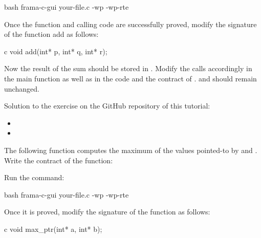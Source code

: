 \begin{CodeBlock}{bash}
frama-c-gui your-file.c -wp -wp-rte
\end{CodeBlock}



Once the function and calling code are successfully proved, modify the
signature of the function add as follows:



\begin{CodeBlock}{c}
void add(int* p, int* q, int* r);
\end{CodeBlock}


Now the result of the sum should be stored in .
Modify the calls accordingly in the main function as well as in the code and the contract
of .  and  should remain
unchanged.


\begin{Information}
  Solution to the exercise on the GitHub repository of this tutorial:
  \begin{itemize}
    \item {}
    \item {}
  \end{itemize}
\end{Information}






The following function computes the maximum of the values pointed-to by
 and . Write the contract of the function:






Run the command:



\begin{CodeBlock}{bash}
frama-c-gui your-file.c -wp -wp-rte
\end{CodeBlock}



Once it is proved, modify the signature of the function as follows:



\begin{CodeBlock}{c}
void max_ptr(int* a, int* b);
\end{CodeBlock}


